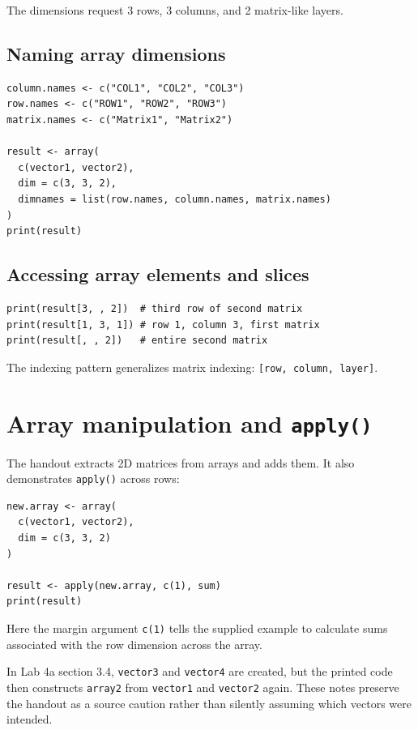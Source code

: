 The dimensions request 3 rows, 3 columns, and 2 matrix-like layers.

\subsection{Naming array dimensions}

\begin{lstlisting}[style=dsr]
column.names <- c("COL1", "COL2", "COL3")
row.names <- c("ROW1", "ROW2", "ROW3")
matrix.names <- c("Matrix1", "Matrix2")

result <- array(
  c(vector1, vector2),
  dim = c(3, 3, 2),
  dimnames = list(row.names, column.names, matrix.names)
)
print(result)
\end{lstlisting}

\subsection{Accessing array elements and slices}

\begin{lstlisting}[style=dsr]
print(result[3, , 2])  # third row of second matrix
print(result[1, 3, 1]) # row 1, column 3, first matrix
print(result[, , 2])   # entire second matrix
\end{lstlisting}

The indexing pattern generalizes matrix indexing: \texttt{[row, column, layer]}.

\section{Array manipulation and \texttt{apply()}}

The handout extracts 2D matrices from arrays and adds them. It also demonstrates \texttt{apply()} across rows:

\begin{lstlisting}[style=dsr]
new.array <- array(
  c(vector1, vector2),
  dim = c(3, 3, 2)
)

result <- apply(new.array, c(1), sum)
print(result)
\end{lstlisting}

Here the margin argument \texttt{c(1)} tells the supplied example to calculate sums associated with the row dimension across the array.

\begin{pitfall}
In Lab 4a section 3.4, \texttt{vector3} and \texttt{vector4} are created, but the printed code then constructs \texttt{array2} from \texttt{vector1} and \texttt{vector2} again. These notes preserve the handout as a source caution rather than silently assuming which vectors were intended.
\end{pitfall}

